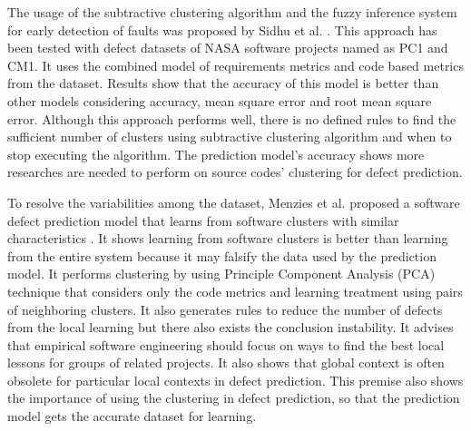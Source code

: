 \documentclass[12pt]{report}
\begin{document}
The usage of the subtractive clustering algorithm and the fuzzy inference system for early detection of faults was proposed by Sidhu et al. \cite{sidhu2010subtractive}. This approach has been tested with defect datasets of NASA software projects named as PC1 and CM1. It uses the combined model of requirements metrics and code based metrics from the dataset. Results show that the accuracy of this model is better than other models considering accuracy, mean square error and root mean square error. Although this approach performs well, there is no defined rules to find the sufficient number of clusters using subtractive clustering algorithm and when to stop executing the algorithm. The prediction model's accuracy shows more researches are needed to perform on source codes' clustering for defect prediction. 


 
To resolve the variabilities among the dataset, Menzies et al. proposed a software defect prediction model that learns from software clusters with similar characteristics \cite{menzies2013local,menzies2011local}. It shows learning from software clusters is better than learning from the entire system because it may falsify the data used by the prediction model. It performs clustering by using Principle Component Analysis (PCA) technique that considers only the code metrics and learning treatment using pairs of neighboring clusters. It also generates rules to reduce the number of defects from the local learning but there also exists the conclusion instability. It advises that empirical software engineering should focus on ways to find the best local lessons for groups of related projects. It also shows that global context is often obsolete for particular local contexts in defect prediction. This premise also shows the importance of using the clustering in defect prediction, so that the prediction model gets the accurate dataset for learning.
\end{document}
